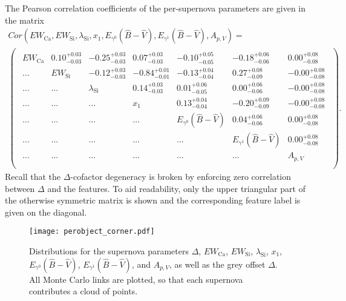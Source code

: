 \documentclass[trackchanges]{aastex62}   	%
\begin{document}
The Pearson correlation coefficients of the per-supernova parameters are given in the matrix
\begin{multline}
Cor(EW_{\mathrm{Ca}}, EW_{\mathrm{Si}}, \lambda_{\mathrm{Si}}, x_1, E_{\gamma^0}({\hat{B}}-{\hat{V}}), E_{\gamma^1}({\hat{B}}-{\hat{V}}), A_{p,V}) =\\
\begin{pmatrix}
\begin{array}{rrrrrrr}
EW_{\mathrm{Ca}} & 0.10^{+0.03}_{-0.03} & -0.25^{+0.03}_{-0.03} & 0.07^{+0.03}_{-0.03} & -0.10^{+0.05}_{-0.05} & -0.18^{+0.06}_{-0.06} & 0.00^{+0.08}_{-0.08} \\
\ldots &EW_{\mathrm{Si}} & -0.12^{+0.03}_{-0.03} & -0.84^{+0.01}_{-0.01} & -0.13^{+0.04}_{-0.04} & 0.27^{+0.08}_{-0.09} & -0.00^{+0.08}_{-0.08} \\
\ldots & \ldots& \lambda_{\mathrm{Si}} & 0.14^{+0.03}_{-0.03} & 0.01^{+0.06}_{-0.05} & 0.00^{+0.06}_{-0.06} & -0.00^{+0.08}_{-0.08} \\
\ldots& \ldots& \ldots& x_1 & 0.13^{+0.04}_{-0.04} & -0.20^{+0.09}_{-0.09} & -0.00^{+0.08}_{-0.08} \\
\ldots& \ldots& \ldots & \ldots& E_{\gamma^0}({\hat{B}}-{\hat{V}})& 0.04^{+0.06}_{-0.06} & 0.00^{+0.08}_{-0.08} \\
\ldots & \ldots & \ldots& \ldots&\ldots & E_{\gamma^1}({\hat{B}}-{\hat{V}})  & 0.00^{+0.08}_{-0.08} \\
\ldots & \ldots & \ldots&\ldots &\ldots &\ldots &  A_{p,V} \\
\end{array}
\end{pmatrix}.
\label{corr:eqn}
\end{multline}
Recall that the $\Delta$-cofactor degeneracy is broken by enforcing zero correlation between $\Delta$ and the features.
To aid readability, only the upper triangular part of the otherwise symmetric matrix is shown and the corresponding feature label is given on
the diagonal.

\begin{figure}[htbp] %
   \centering
   \texttt{[image: perobject\_corner.pdf]} 
   \caption{
   Distributions for the supernova parameters $\Delta$, $EW_{\mathrm{Ca}}$, $EW_{\mathrm{Si}}$, $\lambda_{\mathrm{Si}}$, $x_1$, $E_{\gamma^0}({\hat{B}}-{\hat{V}})$,  $E_{\gamma^1}({\hat{B}}-{\hat{V}})$,  and  $A_{p,V}$, as well as the grey offset
$\Delta$.  All Monte Carlo links are plotted, so that each supernova contributes a cloud of points.
   \label{perobject3:fig}}
\end{figure}
\end{document}
